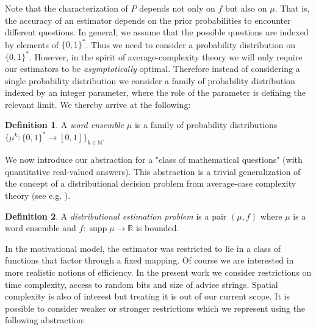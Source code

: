 \documentclass{article}
\numberwithin{equation}{section}
\theoremstyle{definition}
\newtheorem{definition}{Definition}[section]
\theoremstyle{plain}
\newcommand{\Bool}{\{0,1\}}
\newcommand{\Words}{{\Bool^*}}
\DeclareMathOperator{\Supp}{supp}
\newcommand{\Nats}{\mathbb{N}}
\newcommand{\Reals}{\mathbb{R}}
\begin{document}
Note that the characterization of $P$ depends not only on $f$ but also on $\mu$. That is, the accuracy of an estimator depends on the prior probabilities to encounter different questions. In general, we assume that the possible questions are indexed by elements of $\Words$. Thus we need to consider a probability distribution on $\Words$. However, in the spirit of average-complexity theory we will only require our estimators to be \emph{asymptotically} optimal. Therefore instead of considering a single probability distribution we consider a family of probability distribution indexed by an integer parameter, where the role of the parameter is defining the relevant limit. We thereby arrive at the following:

\begin{definition}

A \emph{word ensemble} $\mu$ is a family of probability distributions $\{\mu^k: \Words \rightarrow [0,1]\}_{k \in \Nats}$.

\end{definition}

We now introduce our abstraction for a "class of mathematical questions" (with quantitative real-valued answers). This abstraction is a trivial generalization of the concept of a distributional decision problem from average-case complexity theory (see e.g. \cite{Bogdanov_2006}).

\begin{definition}

A \emph{distributional estimation problem} is a pair $(\mu,f)$ where $\mu$ is a word ensemble and $f: \Supp \mu \rightarrow \Reals$ is bounded.

\end{definition}

In the motivational model, the estimator was restricted to lie in a class of functions that factor through a fixed mapping. Of course we are interested in more realistic notions of efficiency. In the present work we consider restrictions on time complexity, access to random bits and size of advice strings. Spatial complexity is also of interest but treating it is out of our current scope. It is possible to consider weaker or stronger restrictions which we represent using the following abstraction:
\end{document}
